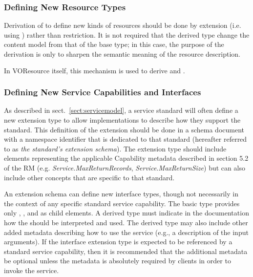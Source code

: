 \documentclass[11pt,a4paper]{ivoa}
\begin{document}
\subsubsection{Defining New Resource Types}
\label{sect:definingresourcetypes}


Derivation of  to define new kinds of
resources should be done by extension (i.e. using 
) rather than restriction.  It is
not required that the derived type change the content model from that
of the  base type; in this case, the purpose
of the derivation is only to sharpen the semantic meaning of the
resource description.  

In VOResource itself, this mechanism is used to derive
and .

\subsubsection{Defining New Service Capabilities and Interfaces}
\label{sect:serviceelements}


As described in sect.~\ref{sect:servicemodel}, a service
standard will often define a new  extension
type to allow implementations to describe how they support the
standard.  This definition of the  extension
should be done in a schema document with a namespace identifier that
is dedicated to that standard (hereafter referred to as \emph{the
standard's extension schema}).  The extension type should include
elements representing the applicable Capability metadata described in
section 5.2 of the RM
(e.g. \emph{Service.MaxReturnRecords}, \emph{Service.MaxReturnSize})
but can also include other concepts that are specific to that standard.


An extension schema can define new interface types, though not
necessarily in the context of any specific standard service
capability.  The basic  type provides only
, , and  as child
elements.  A derived  type must indicate in
the documentation how the  should be
interpreted and used.  The derived type may also include other added
metadata describing how to use the service (e.g., a description of the
input arguments).  If the interface extension type is expected to be
referenced by a standard service capability, then it is recommended
that the additional metadata be optional unless the metadata is
absolutely required by clients in order to invoke the service.
\end{document}
